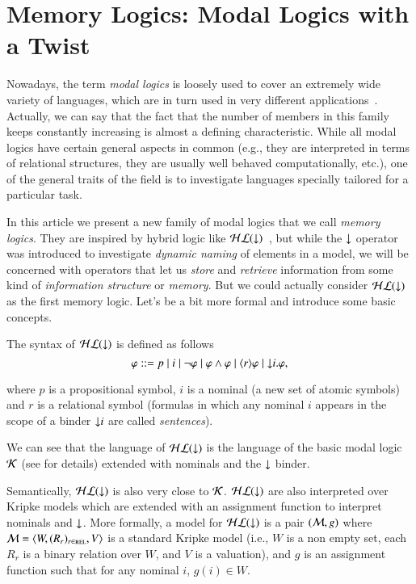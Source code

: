\section{Memory Logics: Modal Logics with a Twist}\label{twist}

Nowadays, the term \emph{modal logics} is loosely used to cover
an extremely wide variety of languages, which are in turn used
in very different applications~\cite{BRV01,blac:hand06}.  Actually,
we can say that the fact
that the number of members in this family keeps constantly increasing
is almost a defining characteristic.  While all modal logics have
certain general aspects in common (e.g., they are interpreted in
terms of relational structures, they are usually well behaved
computationally, etc.), one of the general traits of the field is
to investigate languages specially tailored for a particular task.

In this article we present a new family of modal logics that
we call \emph{memory logics}. They
are inspired by hybrid logic like $\mathcal{HL}({\downarrow})$~\cite{arec:hybr05b}, but while the
${\downarrow}$ operator was introduced to investigate \emph{dynamic naming}
of elements in a model, we will be concerned with operators that
let us \emph{store} and \emph{retrieve} information from some kind
of \emph{information structure} or \emph{memory}.
But we could actually consider $\mathcal{HL}({\downarrow})$ as the first memory logic.
Let's be a bit more formal and introduce some basic concepts.

The syntax of $\mathcal{HL}({\downarrow})$ is defined as follows
$$
\varphi ::= p \mid i \mid \lnot \varphi \mid \varphi \land
\varphi \mid \langle r \rangle \varphi \mid {\downarrow} i. \varphi,
$$

\noindent
where $p$ is a propositional symbol, $i$ is a nominal (a new set of
atomic symbols) and  $r$ is a relational symbol (formulas in which any nominal $i$
appears in the scope of a binder ${\downarrow} i$ are called \emph{sentences}).

We can see that the language of $\mathcal{HL}({\downarrow})$ is the language of the basic
modal logic $\mathcal{K}$ (see \cite{BRV01} for details) extended with nominals
and the ${\downarrow}$ binder.

Semantically, $\mathcal{HL}({\downarrow})$ is also very close to $\mathcal{K}$.  $\mathcal{HL}({\downarrow})$
are also interpreted over Kripke models which are extended with an
assignment function to interpret nominals and ${\downarrow}$. More formally,
a model for $\mathcal{HL}({\downarrow})$ is a pair $(\mathcal{M},g)$ where $\mathcal{M}=\langle W,(R_r)_{r \in \textsc{rel}},V \rangle$ is a standard Kripke model (i.e., $W$ is a non empty set, each $R_r$ is a binary relation
over $W$, and $V$ is a valuation), and $g$ is an assignment function
such that for any nominal $i$, $g(i) \in W$.


